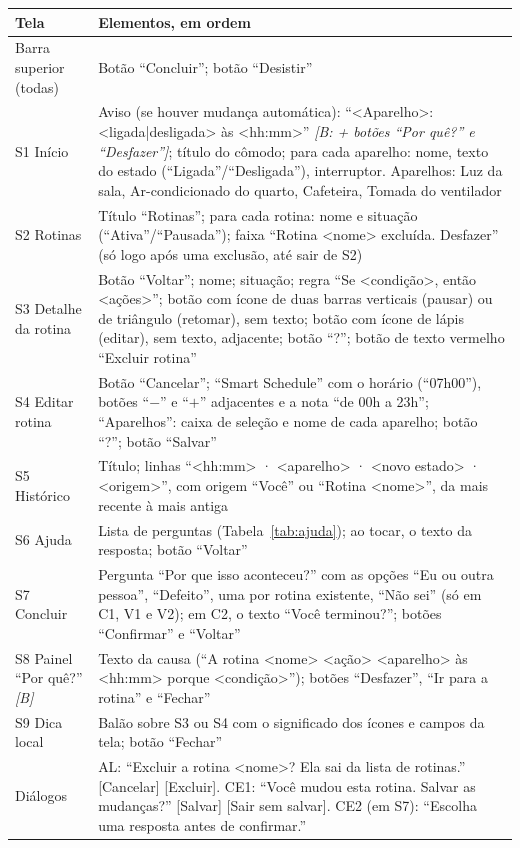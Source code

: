 \begin{tabularx}{\textwidth}{@{}P{2.4cm}Y@{}}
\toprule
\textbf{Tela} & \textbf{Elementos, em ordem} \\
\midrule
Barra superior (todas) & Botão ``Concluir''; botão ``Desistir'' \\
S1 Início & Aviso (se houver mudança automática): ``<Aparelho>: <ligada|desligada> às <hh:mm>'' \textit{[B: + botões ``Por quê?'' e ``Desfazer'']}; título do cômodo; para cada aparelho: nome, texto do estado (``Ligada''/``Desligada''), interruptor. Aparelhos: Luz da sala, Ar-condicionado do quarto, Cafeteira, Tomada do ventilador \\
S2 Rotinas & Título ``Rotinas''; para cada rotina: nome e situação (``Ativa''/``Pausada''); faixa ``Rotina <nome> excluída. Desfazer'' (só logo após uma exclusão, até sair de S2) \\
S3 Detalhe da rotina & Botão ``Voltar''; nome; situação; regra ``Se <condição>, então <ações>''; botão com ícone de duas barras verticais (pausar) ou de triângulo (retomar), sem texto; botão com ícone de lápis (editar), sem texto, adjacente; botão ``?''; botão de texto vermelho ``Excluir rotina'' \\
S4 Editar rotina & Botão ``Cancelar''; ``Smart Schedule'' com o horário (``07h00''), botões ``$-$'' e ``$+$'' adjacentes e a nota ``de 00h a 23h''; ``Aparelhos'': caixa de seleção e nome de cada aparelho; botão ``?''; botão ``Salvar'' \\
S5 Histórico & Título; linhas ``<hh:mm> · <aparelho> · <novo estado> · <origem>'', com origem ``Você'' ou ``Rotina <nome>'', da mais recente à mais antiga \\
S6 Ajuda & Lista de perguntas (Tabela~\ref{tab:ajuda}); ao tocar, o texto da resposta; botão ``Voltar'' \\
S7 Concluir & Pergunta ``Por que isso aconteceu?'' com as opções ``Eu ou outra pessoa'', ``Defeito'', uma por rotina existente, ``Não sei'' (só em C1, V1 e V2); em C2, o texto ``Você terminou?''; botões ``Confirmar'' e ``Voltar'' \\
S8 Painel ``Por quê?'' \textit{[B]} & Texto da causa (``A rotina <nome> <ação> <aparelho> às <hh:mm> porque <condição>''); botões ``Desfazer'', ``Ir para a rotina'' e ``Fechar'' \\
S9 Dica local & Balão sobre S3 ou S4 com o significado dos ícones e campos da tela; botão ``Fechar'' \\
Diálogos & AL: ``Excluir a rotina <nome>? Ela sai da lista de rotinas.'' [Cancelar] [Excluir]. CE1: ``Você mudou esta rotina. Salvar as mudanças?'' [Salvar] [Sair sem salvar]. CE2 (em S7): ``Escolha uma resposta antes de confirmar.'' \\
\bottomrule
\end{tabularx}
